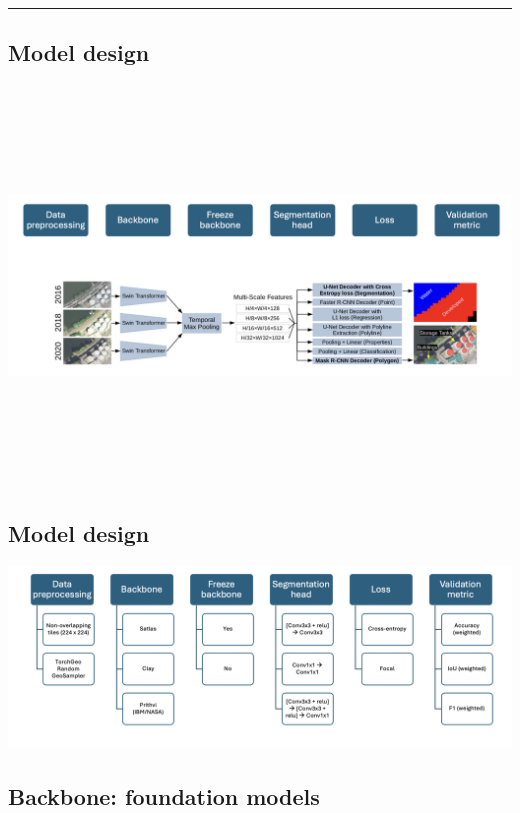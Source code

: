 \documentclass[
  letterpaper,
  DIV=11,
  numbers=noendperiod]{scrartcl}
\begin{document}
\begin{center}\rule{0.5\linewidth}{0.5pt}\end{center}

\subsection{Model design}\label{model-design}

\begin{center}
\includegraphics[width=\textwidth,height=4.16667in]{../figures/algo_design/example.png}
\end{center}

\subsection{Model design}\label{model-design-1}

\begin{center}
\includegraphics{../figures/algo_design/setup.png}
\end{center}

\subsection{Backbone: foundation
models}\label{backbone-foundation-models}
\end{document}
